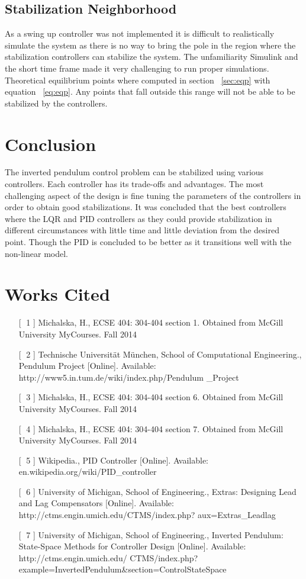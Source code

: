 \documentclass[12pt]{article} %
\begin{document}
\subsection{Stabilization Neighborhood} \label{sec:neigh}
As a swing up controller was not implemented it is difficult to realistically simulate the system as there is no way to bring the pole in the region where the stabilization controllers can stabilize the system. The unfamiliarity Simulink and the short time frame made it very challenging to run proper simulations. Theoretical equilibrium points where computed in section  ~\ref{sec:eqp} with equation ~\ref{eq:eqp}. Any points that fall outside this range will not be able to be stabilized by the controllers.



\section{Conclusion}
The inverted pendulum control problem can be stabilized using various controllers. Each controller has its trade-offs and advantages. The most challenging aspect of the design is fine tuning the parameters of the controllers in order to obtain good stabilizations. It was concluded that the best controllers where the LQR and PID controllers as they could provide stabilization in different circumstances with little time and little deviation from the desired point. Though the PID is concluded to be better as it transitions well with the non-linear model.   
\newpage

\section{Works Cited}
\begin{itemize}
\item [[$\;$ 1]] Michalska, H., ECSE 404: 304-404 section 1. 
Obtained from McGill University MyCourses. Fall 2014
\item [[$\;$ 2]] Technische Universität München, School of Computational Engineering., Pendulum Project [Online]. Available: http://www5.in.tum.de/wiki/index.php/Pendulum \_Project
\item [[$\;$ 3]] Michalska, H., ECSE 404: 304-404 section 6. 
Obtained from McGill University MyCourses. Fall 2014
\item [[$\;$ 4]] Michalska, H., ECSE 404: 304-404 section 7. 
Obtained from McGill University MyCourses. Fall 2014
\item [[$\;$ 5]] Wikipedia., PID Controller [Online]. Available: 
en.wikipedia.org/wiki/PID\_controller
\item [[$\;$ 6]] University of Michigan, School of Engineering., Extras: Designing Lead and Lag Compensators [Online]. Available: http://ctms.engin.umich.edu/CTMS/index.php? aux=Extras\_Leadlag
\item [[$\;$ 7]]  University of Michigan, School of Engineering., Inverted Pendulum: State-Space Methods for Controller Design [Online]. Available: http://ctms.engin.umich.edu/ CTMS/index.php?example=InvertedPendulum\&section=ControlStateSpace
\end{itemize}
\end{document}
